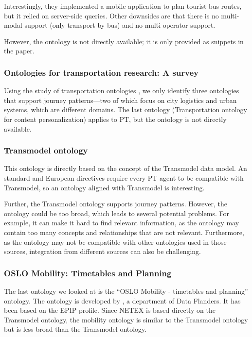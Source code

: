 Interestingly, they implemented a mobile application to plan tourist bus routes, but it relied on server-side queries. Other downsides are that there is no multi-modal support (only transport by bus) and no multi-operator support.

However, the ontology is not directly available; it is only provided as snippets in the paper. 
\subsubsection{Ontologies for transportation research: A survey  }
Using the study of transportation ontologies \cite{katsumi_ontologies_2018}, we only identify three ontologies that support journey patterns—two of which focus on city logistics and urban systems, which are different domains. The last ontology (Transportation ontology for content personalization) applies to PT, but the ontology is not directly available.

\subsubsection{Transmodel ontology}
This ontology is directly based on the concept of the Transmodel data model. An  standard and European directives require every PT agent to be compatible with Transmodel, so an ontology aligned with Transmodel is interesting.

Further, the Transmodel ontology supports journey patterns. However, the ontology could be too broad, which leads to several potential problems. For example, it can make it hard to find relevant information, as the ontology may contain too many concepts and relationships that are not relevant. Furthermore, as the ontology may not be compatible with other ontologies used in those sources, integration from different sources can also be challenging.

\subsubsection{OSLO Mobility: Timetables and Planning}
The last ontology we looked at is the “OSLO Mobility - timetables and planning” \cite{noauthor_oslo_2023} ontology. The ontology is developed by , a department of Data Flanders. It has been based on the EPIP profile. Since NETEX is based directly on the Transmodel ontology, the  mobility ontology is similar to the Transmodel ontology but is less broad than the Transmodel ontology.

